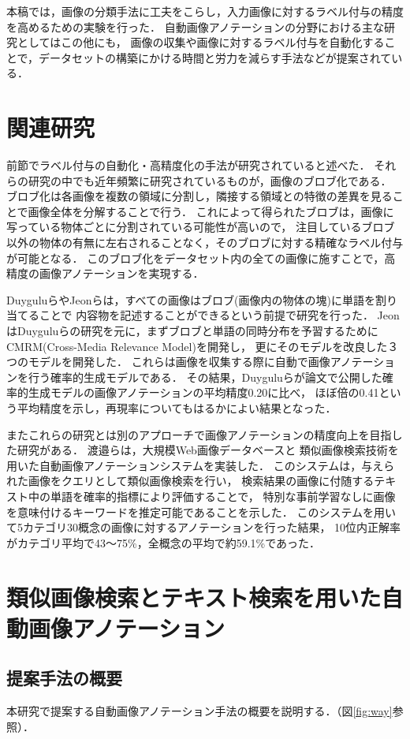 本稿では，画像の分類手法に工夫をこらし，入力画像に対するラベル付与の精度を高めるための実験を行った．
自動画像アノテーションの分野における主な研究としてはこの他にも，
画像の収集や画像に対するラベル付与を自動化することで，データセットの構築にかける時間と労力を減らす手法などが提案されている．

\chapter{関連研究}
\label{sec:related}
前節でラベル付与の自動化・高精度化の手法が研究されていると述べた．
それらの研究の中でも近年頻繁に研究されているものが，画像のブロブ化である．
ブロブ化は各画像を複数の領域に分割し，隣接する領域との特徴の差異を見ることで画像全体を分解することで行う．
これによって得られたブロブは，画像に写っている物体ごとに分割されている可能性が高いので，
注目しているブロブ以外の物体の有無に左右されることなく，そのブロブに対する精確なラベル付与が可能となる．
このブロブ化をデータセット内の全ての画像に施すことで，高精度の画像アノテーションを実現する．

Duygulu\cite{duygulu}らやJeon\cite{jeon}らは，すべての画像はブロブ(画像内の物体の塊)に単語を割り当てることで
内容物を記述することができるという前提で研究を行った．
JeonはDuyguluらの研究を元に，まずブロブと単語の同時分布を予習するためにCMRM(Cross-Media Relevance Model)を開発し，
更にそのモデルを改良した３つのモデルを開発した．
これらは画像を収集する際に自動で画像アノテーションを行う確率的生成モデルである．
その結果，Duyguluらが論文で公開した確率的生成モデルの画像アノテーションの平均精度0.20に比べ，
ほぼ倍の0.41という平均精度を示し，再現率についてもはるかによい結果となった．

またこれらの研究とは別のアプローチで画像アノテーションの精度向上を目指した研究がある．
渡邉ら\cite{watanabe}は，大規模Web画像データベースと
類似画像検索技術を用いた自動画像アノテーションシステムを実装した．
このシステムは，与えられた画像をクエリとして類似画像検索を行い，
検索結果の画像に付随するテキスト中の単語を確率的指標により評価することで，
特別な事前学習なしに画像を意味付けるキーワードを推定可能であることを示した．
このシステムを用いて5カテゴリ30概念の画像に対するアノテーションを行った結果，
10位内正解率がカテゴリ平均で43～75\%，全概念の平均で約59.1\%であった．

\chapter{類似画像検索とテキスト検索を用いた自動画像アノテーション}
\label{sec:way}
\section{提案手法の概要}
本研究で提案する自動画像アノテーション手法の概要を説明する．（図\ref{fig:way}参照）．

